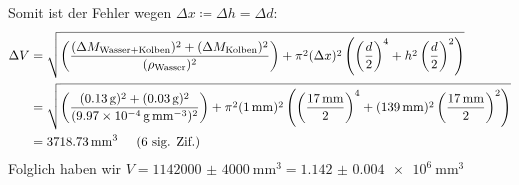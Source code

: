 Somit ist der Fehler wegen $\Delta x \coloneqq \Delta h = \Delta d$:
\begin{align*}
	\Delta V &= \sqrt{\left(\frac{(\Delta M_{\text{Wasser+Kolben}})^2 + (\Delta M_{\text{Kolben}})^2}{(\rho_\text{Wasser})^2}\right) + \pi^2 (\Delta x)^2\left(\left(\frac{d}{2}\right)^4 + h^2 \left(\frac{d}{2}\right)^2\right)} \\
	&= \sqrt{\left(\frac{(\SI{0.13}{\gram})^2 + (\SI{0.03}{\gram})^2}{(\SI{9.97e-4}{\gram\per\milli\meter\cubed})^2}\right) + \pi^2 (\SI{1}{\milli\meter})^2\left(\left(\frac{\SI{17}{\milli\meter}}{2}\right)^4 + (\SI{139}{\milli\meter})^2 \left(\frac{\SI{17}{\milli\meter}}{2}\right)^2\right)} \\
	&= \SI{3718.73}{\milli\meter\cubed} \hspace{0.5cm}\text{(6 sig. Zif.)}
\end{align*}
Folglich haben wir $V = \SI{1142000(4000)}{\milli\meter\cubed} = \SI{1.142(4)e6}{\milli\meter\cubed}$

